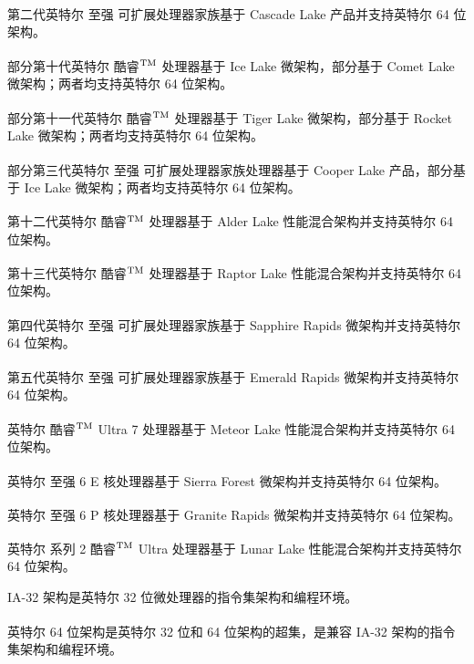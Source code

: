 \documentclass{article}
\begin{document}
第二代英特尔\textsuperscript{\textregistered} 至强\textsuperscript{\textregistered} 可扩展处理器家族基于 Cascade Lake 产品并支持英特尔 64 位架构。

部分第十代英特尔\textsuperscript{\textregistered} 酷睿$^{\rm{TM}}$ 处理器基于 Ice Lake 微架构，部分基于 Comet Lake 微架构；两者均支持英特尔 64 位架构。

部分第十一代英特尔\textsuperscript{\textregistered} 酷睿$^{\rm{TM}}$ 处理器基于 Tiger Lake 微架构，部分基于 Rocket Lake 微架构；两者均支持英特尔 64 位架构。

部分第三代英特尔\textsuperscript{\textregistered} 至强\textsuperscript{\textregistered} 可扩展处理器家族处理器基于 Cooper Lake 产品，部分基于 Ice Lake 微架构；两者均支持英特尔 64 位架构。

第十二代英特尔\textsuperscript{\textregistered} 酷睿$^{\rm{TM}}$ 处理器基于 Alder Lake 性能混合架构并支持英特尔 64 位架构。

第十三代英特尔\textsuperscript{\textregistered} 酷睿$^{\rm{TM}}$ 处理器基于 Raptor Lake 性能混合架构并支持英特尔 64 位架构。

第四代英特尔\textsuperscript{\textregistered} 至强\textsuperscript{\textregistered} 可扩展处理器家族基于 Sapphire Rapids 微架构并支持英特尔 64 位架构。

第五代英特尔\textsuperscript{\textregistered} 至强\textsuperscript{\textregistered} 可扩展处理器家族基于 Emerald Rapids 微架构并支持英特尔 64 位架构。

英特尔\textsuperscript{\textregistered} 酷睿$^{\rm{TM}}$ Ultra 7 处理器基于 Meteor Lake 性能混合架构并支持英特尔 64 位架构。

英特尔\textsuperscript{\textregistered} 至强\textsuperscript{\textregistered} 6 E 核处理器基于 Sierra Forest 微架构并支持英特尔 64 位架构。

英特尔\textsuperscript{\textregistered} 至强\textsuperscript{\textregistered} 6 P 核处理器基于 Granite Rapids 微架构并支持英特尔 64 位架构。

英特尔\textsuperscript{\textregistered} 系列 2 酷睿$^{\rm{TM}}$ Ultra 处理器基于 Lunar Lake 性能混合架构并支持英特尔 64 位架构。

IA-32 架构是英特尔 32 位微处理器的指令集架构和编程环境。

英特尔\textsuperscript{\textregistered} 64 位架构是英特尔 32 位和 64 位架构的超集，是兼容 IA-32 架构的指令集架构和编程环境。
\end{document}
